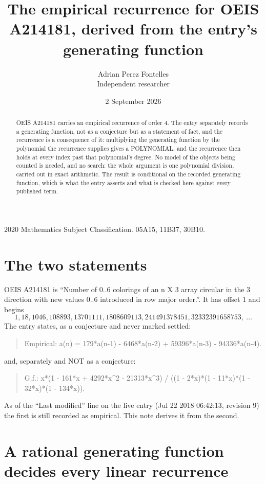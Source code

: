 \documentclass[11pt,a4paper]{article}
\title{The empirical recurrence for OEIS A214181, derived from the entry's generating function}
\author{Adrian Perez Fontelles\\ \small Independent researcher}
\date{2 September 2026}
\theoremstyle{plain}
\theoremstyle{definition}
\begin{document}
\maketitle

\begin{abstract}
OEIS A214181 carries an empirical recurrence of order $4$. The entry separately records a
generating function, not as a conjecture but as a statement of fact, and the recurrence is a
consequence of it: multiplying the generating function by the polynomial the recurrence
supplies gives a POLYNOMIAL, and the recurrence then holds at every index past that
polynomial's degree. No model of the objects being counted is needed, and no search: the
whole argument is one polynomial division, carried out in exact arithmetic. The result is
conditional on the recorded generating function, which is what the entry asserts and what is
checked here against every published term.
\end{abstract}

\noindent\small 2020 Mathematics Subject Classification. 05A15, 11B37, 30B10.\normalsize

\section{The two statements}

OEIS A214181 is ``Number of 0..6 colorings of an n X 3 array circular in the 3 direction with new values 0..6 introduced in row major order.''. It has offset $1$ and begins
\[
1, 18, 1046, 108893, 13701111, 1808609113, 241491378451, 32332391658753,\ \dots
\]
The entry states, as a conjecture and never marked settled:
\begin{quote}
Empirical: a(n) = 179*a(n-1) - 6468*a(n-2) + 59396*a(n-3) - 94336*a(n-4).
\end{quote}
and, separately and NOT as a conjecture:
\begin{quote}
G.f.: x*(1 - 161*x + 4292*x\^{}2 - 21313*x\^{}3) / ((1 - 2*x)*(1 - 11*x)*(1 - 32*x)*(1 - 134*x)).
\end{quote}
As of the ``Last modified'' line on the live entry (Jul 22 2018 06:42:13, revision 9) the first is still
recorded as empirical. This note derives it from the second.

\section{A rational generating function decides every linear recurrence}
\end{document}
